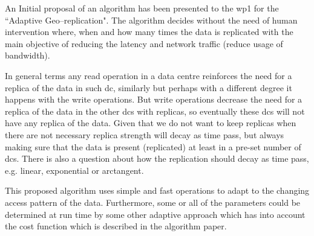 \documentclass[12pt,twoside]{article}
\begin{document}
An Initial proposal of an algorithm has been presented to the \gls{wp1} for the ``Adaptive Geo--replication". The algorithm decides without the need of human intervention where, when and how many times the data is replicated with the main objective of reducing the latency and network traffic (reduce usage of bandwidth).

In general terms any read operation in a data centre reinforces the need for a replica of the data in such \gls{dc}, similarly but perhaps with a different degree it happens with the write operations. But write operations decrease the need for a replica of the data in the other \glspl{dc} with replicas, so eventually these \glspl{dc} will not have any replica of the data. Given that we do not want to keep replicas when there are not necessary replica strength will decay as time pass, but always making sure that the data is present (replicated) at least in a pre-set number of \glspl{dc}. There is also a question about how the replication should decay as time pass, e.g. linear, exponential or arctangent.

This proposed algorithm uses simple and fast operations to adapt to the changing access pattern of the data. Furthermore, some or all of the parameters could be determined at run time by some other adaptive approach which has into account the cost function which is described in the algorithm paper.\\
\end{document}
